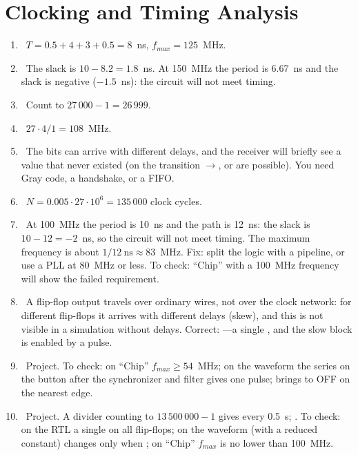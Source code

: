 \section*{Clocking and Timing Analysis}
\begin{enumerate}
  \item {}~$T = 0.5+4+3+0.5 = 8$~ns, $f_{max}=125$~MHz.
  \item {}~The slack is $10-8.2=1.8$~ns. At 150~MHz the period is 6.67~ns and the slack is negative ($-1.5$~ns): the circuit will not meet timing.
  \item {}~Count to $27\,000-1 = 26\,999$.
  \item {}~$27\cdot 4/1 = 108$~MHz.
  \item {}~The bits can arrive with different delays, and the receiver will briefly see a value that never existed (on the transition $\to$,  or  are possible). You need Gray code, a handshake, or a FIFO.
  \item {}~$N = 0.005\cdot 27\cdot 10^6 = 135\,000$ clock cycles.
  \item {}~At 100~MHz the period is 10~ns and the path is 12~ns: the slack is $10-12=-2$~ns, so the circuit will not meet timing. The maximum frequency is about $1/12~\text{ns}\approx 83$~MHz. Fix: split the logic with a pipeline, or use a PLL at 80~MHz or less. To check: ``Chip'' with a 100~MHz frequency will show the failed requirement.
  \item {}~A flip-flop output travels over ordinary wires, not over the clock network: for different flip-flops it arrives with different delays (skew), and this is not visible in a simulation without delays. Correct: ---a single , and the slow block is enabled by a pulse.
  \item {}~Project. To check: on ``Chip'' $f_{max}\ge 54$~MHz; on the waveform the series  on the button after the synchronizer and filter gives one  pulse;  brings  to OFF on the nearest edge.
  \item {}~Project. A divider counting to $13\,500\,000-1$ gives  every 0.5~s; . To check: on the RTL a single  on all flip-flops; on the waveform (with a reduced constant)  changes only when ; on ``Chip'' $f_{max}$ is no lower than 100~MHz.
\end{enumerate}

